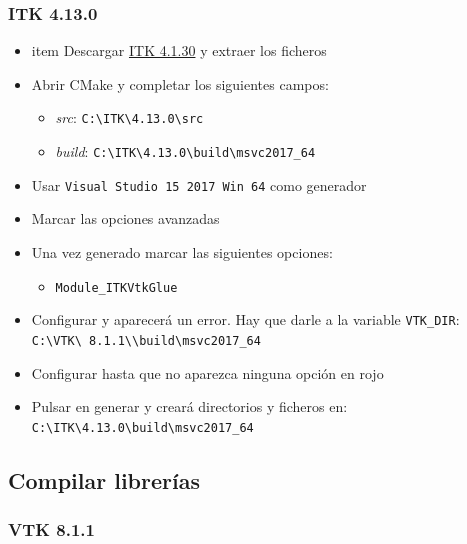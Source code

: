 \subsubsection{ITK 4.13.0}

\begin{itemize}
	\item item Descargar \href{https://sourceforge.net/projects/itk/files/itk/4.13/InsightToolkit-4.13.0.zip/download}{ITK 4.1.30} y extraer los ficheros
	\item Abrir CMake y completar los siguientes campos:
	\begin{itemize}
		\item \textit{src}: \texttt{C:\textbackslash ITK\textbackslash 4.13.0\textbackslash src}
		\item \textit{build}: \texttt{C:\textbackslash ITK\textbackslash 4.13.0\textbackslash build\textbackslash msvc2017\_64}
	\end{itemize}
	\item Usar \texttt{Visual Studio 15 2017 Win 64} como generador
	\item Marcar las opciones avanzadas
	\item Una vez generado marcar las siguientes opciones:
	\begin{itemize}
		\item \texttt{Module\_ITKVtkGlue}
	\end{itemize}
	\item Configurar y aparecerá un error. Hay que darle a la variable \texttt{VTK\_DIR}: \\ \texttt{C:\textbackslash VTK\textbackslash\ 8.1.1\textbackslash \textbackslash build\textbackslash msvc2017\_64}
	\item Configurar hasta que no aparezca ninguna opción en rojo
	\item Pulsar en generar y creará directorios y ficheros en: \\ \texttt{C:\textbackslash ITK\textbackslash 4.13.0\textbackslash build\textbackslash msvc2017\_64}
\end{itemize}

\subsection{Compilar librerías}

\subsubsection{VTK 8.1.1}

